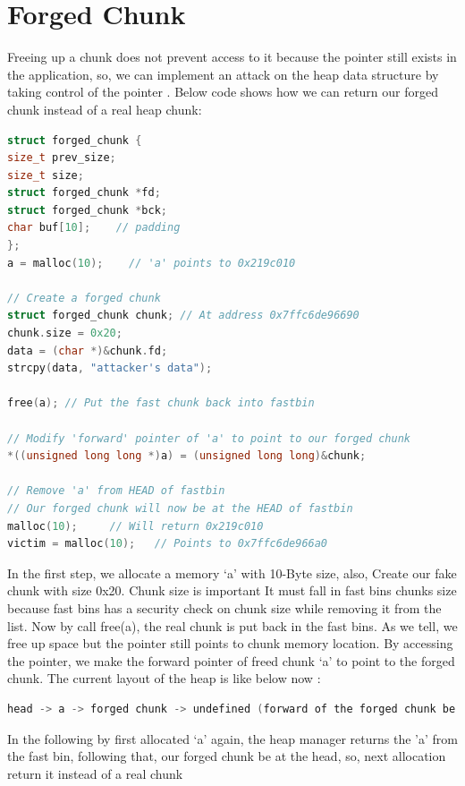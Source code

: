 \documentclass{masterthesis}
\newcommand*\fb{fast bins}
\begin{document}
\section{Forged Chunk}
Freeing up a chunk does not prevent access to it because the pointer still exists in the application, so, we can implement an attack on the heap data structure by taking control of the pointer . Below code shows how we can return our forged chunk instead of a real heap chunk: 

\begin{lstlisting}[language=c,frame=tlrb]
struct forged_chunk {
size_t prev_size;
size_t size;
struct forged_chunk *fd;
struct forged_chunk *bck;
char buf[10];    // padding
};
a = malloc(10);    // 'a' points to 0x219c010

// Create a forged chunk
struct forged_chunk chunk; // At address 0x7ffc6de96690
chunk.size = 0x20;
data = (char *)&chunk.fd;  
strcpy(data, "attacker's data");

free(a); // Put the fast chunk back into fastbin

// Modify 'forward' pointer of 'a' to point to our forged chunk
*((unsigned long long *)a) = (unsigned long long)&chunk;

// Remove 'a' from HEAD of fastbin
// Our forged chunk will now be at the HEAD of fastbin
malloc(10);     // Will return 0x219c010
victim = malloc(10);   // Points to 0x7ffc6de966a0
\end{lstlisting}

In the first step, we allocate a memory ‘a’ with 10-Byte size, also, Create our fake chunk with size 0x20. Chunk size is important It must fall in \fb{} chunks size because \fb{} has a security check on chunk size while removing it from the list.
Now by call free(a), the real chunk is put back in the \fb{}. As we tell, we free up space but the pointer still points to chunk memory location. By accessing the pointer, we make the forward pointer of freed chunk ‘a’ to point to the forged chunk. The current layout of the heap is like below now : 

\begin{lstlisting}[language=c,frame=tlrb]
head -> a -> forged chunk -> undefined (forward of the forged chunk be holding attacker's data)
\end{lstlisting}

In the following by first allocated ‘a’ again, the heap manager returns the 'a' from the fast bin, following that, our forged chunk be at the head, so, next allocation return it instead of a real chunk
\end{document}
